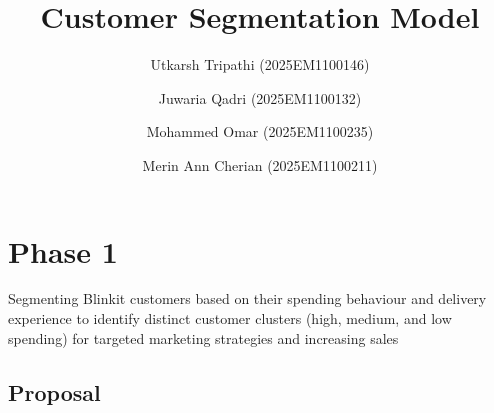 \documentclass[
  letterpaper,
  DIV=11,
  numbers=noendperiod]{scrartcl}
\title{Customer Segmentation Model}
\author{Utkarsh Tripathi (2025EM1100146) \and Juwaria Qadri
(2025EM1100132) \and Mohammed Omar (2025EM1100235) \and Merin Ann
Cherian (2025EM1100211)}
\date{}
\begin{document}
\maketitle


\section{Phase 1}\label{phase-1}

Segmenting Blinkit customers based on their spending behaviour and
delivery experience to identify distinct customer clusters (high,
medium, and low spending) for targeted marketing strategies and
increasing sales

\subsection{Proposal}\label{proposal}
\end{document}
